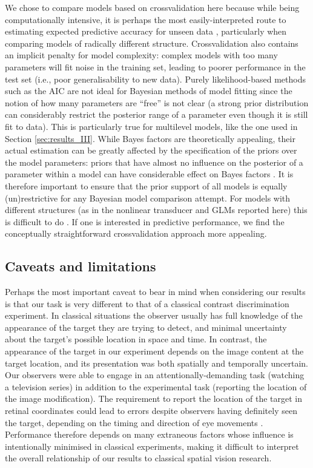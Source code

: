 \documentclass[11pt,a4paper]{article}
\begin{document}
{We chose to compare models based on crossvalidation here because while being computationally intensive, it is perhaps the most easily-interpreted route to estimating expected predictive accuracy for unseen data \citep{Gelman2014}, particularly when comparing models of radically different structure. 
Crossvalidation also contains an implicit penalty for model complexity: complex models with too many parameters will fit noise in the training set, leading to poorer performance in the test set (i.e., poor generalisability to new data). 
Purely likelihood-based methods such as the AIC are not ideal for Bayesian methods of model fitting since the notion of how many parameters are ``free'' is not clear (a strong prior distribution can considerably restrict the posterior range of a parameter even though it is still fit to data).
This is particularly true for multilevel models, like the one used in Section \ref{sec:results_III}.
While Bayes factors are theoretically appealing, their actual estimation can be greatly affected by the specification of the priors over the model parameters:
priors that have almost no influence on the posterior of a parameter within a model can have considerable effect on Bayes factors \citep{Gelman2012a}.
It is therefore important to ensure that the prior support of all models is equally (un)restrictive for any Bayesian model comparison attempt. 
For models with different structures (as in the nonlinear transducer and GLMs reported here) this is difficult to do \citep[but not impossible by using a sensitivity analysis;][]{Lee2014}.
If one is interested in predictive performance, we find the conceptually straightforward crossvalidation approach more appealing.


\subsection{Caveats and limitations}

Perhaps the most important caveat to bear in mind when considering our results is that our task is very different to that of a classical contrast discrimination experiment.
In classical situations the observer usually has full knowledge of the appearance of the target they are trying to detect, and minimal uncertainty about the target's possible location in space and time.
In contrast, the appearance of the target in our experiment depends on the image content at the target location, and its presentation was both spatially and temporally uncertain.
Our observers were able to engage in an attentionally-demanding task (watching a television series) in addition to the experimental task (reporting the location of the image modification).
The requirement to report the location of the target in retinal coordinates could lead to errors despite observers having definitely seen the target, depending on the timing and direction of eye movements \citep[geotopic mislocalisation;][]{Dorr2013}.
Performance therefore depends on many extraneous factors whose influence is intentionally minimised in classical experiments, making it difficult to interpret the overall relationship of our results to classical spatial vision research.

}
\end{document}
